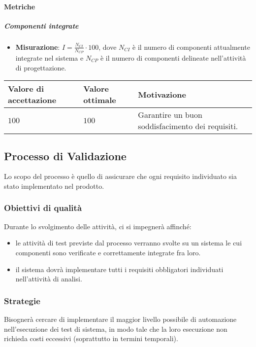\paragraph{Metriche}
\subparagraph{Componenti integrate}

\begin{itemize}
\item \textbf{Misurazione}: $I=\frac{N_{CI}}{N_{CP}} \cdot 100$, dove $N_{CI}$ è il numero di componenti attualmente integrate nel sistema e $N_{CP}$ è il numero di componenti delineate nell'attività di progettazione.
\end{itemize}

\begin{center}
		\begin{tabular}{|P{2.5cm}|P{2.5cm}|P{6cm}|}
		\hline
			\textbf{Valore di accettazione}	& \textbf{Valore ottimale} & \textbf{Motivazione} \\
			\hline
			$100$ & $100$ &	Garantire un buon soddisfacimento dei requisiti. \\
			\hline
			\end{tabular}
\end{center}

\subsection{Processo di Validazione}
Lo scopo del processo è quello di assicurare che ogni requisito individuato sia stato implementato nel prodotto.

\subsubsection{Obiettivi di qualità}
Durante lo svolgimento delle attività, ci si impegnerà affinché:
\begin{itemize}
\item le attività di test previste dal processo verranno svolte su un sistema le cui componenti sono verificate e correttamente integrate fra loro.
\item il sistema dovrà implementare tutti i requisiti obbligatori individuati nell'attività di analisi.
\end{itemize}

\subsubsection{Strategie}
Bisognerà cercare di implementare il maggior livello possibile di automazione nell'esecuzione dei test di sistema, in modo tale che la loro esecuzione non richieda costi eccessivi (soprattutto in termini temporali).

